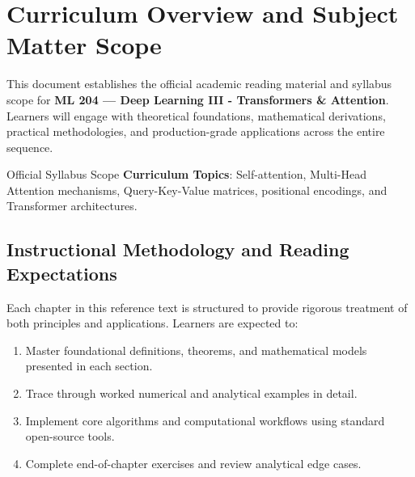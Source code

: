 \section{Curriculum Overview and Subject Matter Scope}

This document establishes the official academic reading material and syllabus scope for \textbf{ML 204 --- Deep Learning III - Transformers \& Attention}. Learners will engage with theoretical foundations, mathematical derivations, practical methodologies, and production-grade applications across the entire sequence.

\begin{InsightBox}{Official Syllabus Scope}
  \textbf{Curriculum Topics}: Self-attention, Multi-Head Attention mechanisms, Query-Key-Value matrices, positional encodings, and Transformer architectures.
\end{InsightBox}

\subsection{Instructional Methodology and Reading Expectations}

Each chapter in this reference text is structured to provide rigorous treatment of both principles and applications. Learners are expected to:
\begin{enumerate}
  \item Master foundational definitions, theorems, and mathematical models presented in each section.
  \item Trace through worked numerical and analytical examples in detail.
  \item Implement core algorithms and computational workflows using standard open-source tools.
  \item Complete end-of-chapter exercises and review analytical edge cases.
\end{enumerate}

